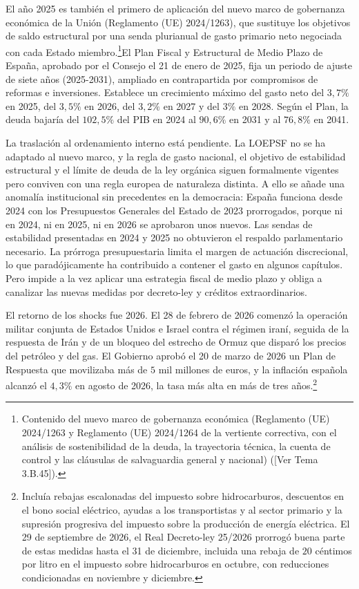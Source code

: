 \documentclass[10pt,a4paper]{article}
\newcommand{\authorfont}[1]{{\fontfamily{EBGaramond-TLF}\selectfont #1}}
\begin{document}
El año 2025 es también el primero de aplicación del nuevo marco de gobernanza económica de la Unión (Reglamento (UE) 2024/1263), que sustituye los objetivos de saldo estructural por una senda plurianual de gasto primario neto negociada con cada Estado miembro.\footnote{%
    Contenido del nuevo marco de gobernanza económica (Reglamento (UE) 2024/1263 y Reglamento (UE) 2024/1264 de la vertiente correctiva, con el análisis de sostenibilidad de la deuda, la trayectoria técnica, la cuenta de control y las cláusulas de salvaguardia general y nacional) ([\authorfont{Ver Tema 3.B.45}]).
}El Plan Fiscal y Estructural de Medio Plazo de España, aprobado por el Consejo el 21 de enero de 2025, fija un periodo de ajuste de siete años (2025-2031), ampliado en contrapartida por compromisos de reformas e inversiones. Establece un crecimiento máximo del gasto neto del $3,7\%$ en 2025, del $3,5\%$ en 2026, del $3,2\%$ en 2027 y del $3\%$ en 2028. Según el Plan, la deuda bajaría del $102,5\%$ del PIB en 2024 al $90,6\%$ en 2031 y al $76,8\%$ en 2041.

La traslación al ordenamiento interno está pendiente. La LOEPSF no se ha adaptado al nuevo marco, y la regla de gasto nacional, el objetivo de estabilidad estructural y el límite de deuda de la ley orgánica siguen formalmente vigentes pero conviven con una regla europea de naturaleza distinta. A ello se añade una anomalía institucional sin precedentes en la democracia: España funciona desde 2024 con los Presupuestos Generales del Estado de 2023 prorrogados, porque ni en 2024, ni en 2025, ni en 2026 se aprobaron unos nuevos. Las sendas de estabilidad presentadas en 2024 y 2025 no obtuvieron el respaldo parlamentario necesario. La prórroga presupuestaria limita el margen de actuación discrecional, lo que paradójicamente ha contribuido a contener el gasto en algunos capítulos. Pero impide a la vez aplicar una estrategia fiscal de medio plazo y obliga a canalizar las nuevas medidas por decreto-ley y créditos extraordinarios.

El retorno de los shocks fue 2026. El 28 de febrero de 2026 comenzó la operación militar conjunta de Estados Unidos e Israel contra el régimen iraní, seguida de la respuesta de Irán y de un bloqueo del estrecho de Ormuz que disparó los precios del petróleo y del gas. El Gobierno aprobó el 20 de marzo de 2026 un Plan de Respuesta que movilizaba más de $5$ mil millones de euros, y la inflación española alcanzó el $4,3\%$ en agosto de 2026, la tasa más alta en más de tres años.\footnote{%
    Incluía rebajas escalonadas del impuesto sobre hidrocarburos, descuentos en el bono social eléctrico, ayudas a los transportistas y al sector primario y la supresión progresiva del impuesto sobre la producción de energía eléctrica. El 29 de septiembre de 2026, el Real Decreto-ley 25/2026 prorrogó buena parte de estas medidas hasta el 31 de diciembre, incluida una rebaja de $20$ céntimos por litro en el impuesto sobre hidrocarburos en octubre, con reducciones condicionadas en noviembre y diciembre.
} 
\end{document}

